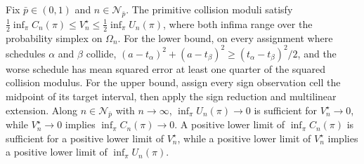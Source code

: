 Fix \(\bar p\in(0,1)\) and \(n\in\mathcal N_{\bar p}\). The primitive collision moduli satisfy \(\frac12\inf_{\pi}C_n(\pi)\le V_n^\star\le\frac12\inf_{\pi}U_n(\pi)\), where both infima range over the probability simplex on \(\Omega_n\). For the lower bound, on every assignment where schedules \(\alpha\) and \(\beta\) collide, \((a-t_\alpha)^2+(a-t_\beta)^2\ge(t_\alpha-t_\beta)^2/2\), and the worse schedule has mean squared error at least one quarter of the squared collision modulus. For the upper bound, assign every sign observation cell the midpoint of its target interval, then apply the sign reduction and multilinear extension. Along \(n\in\mathcal N_{\bar p}\) with \(n\to\infty\), \(\inf_\pi U_n(\pi)\to0\) is sufficient for \(V_n^\star\to0\), while \(V_n^\star\to0\) implies \(\inf_\pi C_n(\pi)\to0\). A positive lower limit of \(\inf_\pi C_n(\pi)\) is sufficient for a positive lower limit of \(V_n^\star\), while a positive lower limit of \(V_n^\star\) implies a positive lower limit of \(\inf_\pi U_n(\pi)\).